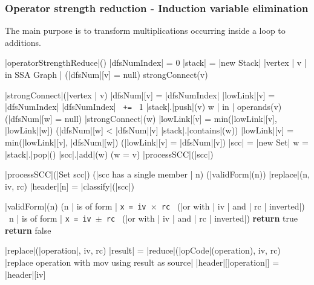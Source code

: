 \documentclass[a4paper,12pt, notitlepage]{article}
\newcommand{\negv}{\vspace{-0.7cm}}
\begin{document}
\subsubsection*{Operator strength reduction - Induction variable elimination}
The main purpose is to transform multiplications occurring inside a loop to
additions.
\begin{program}
\PROC |operatorStrengthReduce|() \BODY
    |dfsNumIndex| = 0
    |stack| = |new Stack|
    \FOREACH |vertex | v | in SSA Graph | \DO
        \IF (|dfsNum|[v] = null) \AR*
            strongConnect(v)
        \FI \OD
\end{program} \negv
\begin{program}
\PROC |strongConnect|(|vertex | v) \BODY
    |dfsNum|[v] = |dfsNumIndex|
    |lowLink|[v] = |dfsNumIndex|
    |dfsNumIndex| \texttt{ += } 1
    |stack|.|push|(v)
    \FOREACH w | in | operands(v) \DO
        \IF (|dfsNum|[w] = null) \AR*
            |strongConnect|(w)
            |lowLink|[v] = min(|lowLink|[v], |lowLink|[w])
        \ELSIF (|dfsNum|[w] < |dfsNum|[v] \land |stack|.|contains|(w)) \AR*
            |lowLink|[v] = min(|lowLink|[v], |dfsNum|[w]) \FI
    \OD
    \IF (|lowLink|[v] = |dfsNum|[v]) \AR*
        |scc| = |new Set|
        \DOW
            w = |stack|.|pop|()
            |scc|.|add|(w)
        \ODW (w \not= v)
        |processSCC|(|scc|)
    \FI
\end{program} \negv
\begin{program}
\PROC |processSCC|(|Set scc|) \BODY
    \IF (|scc has a single member | n) \AR*
        \IF (|validForm|(n)) \AR*
            |replace|(n, iv, rc)
        \ELSE
            |header|[n] = \bot
        \FI
    \ELSE
        |classify|(|scc|)
\end{program} \negv
\begin{program}
\FUNCT |validForm|(n) \AR*
    \IF (n | is of form | \texttt{x = iv $\times$ rc } (|or with | iv | and | rc | inverted|)
         \lor \ n | is of form | \texttt{x = iv $\pm$ rc } (|or with | iv | and | rc | inverted|)
         \textbf{return } true \FI
    \textbf{return } false
\end{program}\negv
\begin{program}
\PROC |replace|(|operation|, iv, rc) \BODY
    |result| = |reduce|(|opCode|(operation), iv, rc)
    |replace operation with mov using result as source|
    |header|[|operation|] = |header|[iv]
\end{program} \negv
\end{document}
